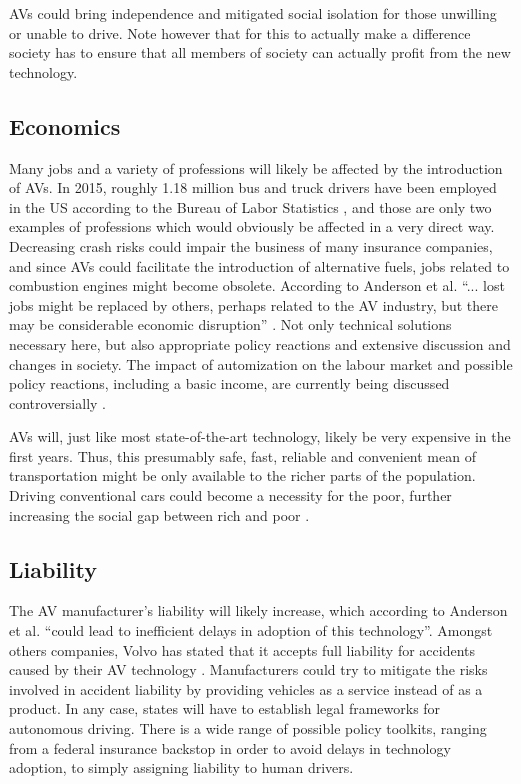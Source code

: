 \documentclass[11pt]{article}
\begin{document}
AVs could bring independence and mitigated social isolation for those unwilling or unable to drive. Note however that for this to actually make a difference society has to ensure that all members of society can actually profit from the new technology.

\subsection{Economics}
Many jobs and a variety of professions will likely be affected by the introduction of AVs. In 2015, roughly 1.18 million bus and truck drivers have been employed in the US according to the Bureau of Labor Statistics \cite{USLabourBureau2016}, and those are only two examples of professions which would obviously be affected in a very direct way. Decreasing crash risks could impair the business of many insurance companies, and since AVs could facilitate the introduction of alternative fuels, jobs related to combustion engines might become obsolete. According to Anderson et al. ``... lost jobs might be replaced by others, perhaps related to the AV industry, but there may be considerable economic disruption'' \cite[p. 40ff]{Anderson2014rand}. Not only technical solutions necessary here, but also appropriate policy reactions and extensive discussion and changes in society. The impact of automization on the labour market and possible policy reactions, including a basic income, are currently being discussed controversially \cite{VanDerVeen2002, Olsen2014}.

AVs will, just like most state-of-the-art technology, likely be very expensive in the first years. Thus, this presumably safe, fast, reliable and convenient mean of transportation might be only available to the richer parts of the population. Driving conventional cars could become a necessity for the poor, further increasing the social gap between rich and poor \cite[p. 39]{Anderson2014rand}.

\subsection{Liability}
The AV manufacturer's liability will likely increase, which according to Anderson et al. ``could lead to inefficient delays in adoption of this technology''. Amongst others companies, Volvo has stated that it accepts full liability for accidents caused by their AV technology \cite{HarrisVolvo2015}. Manufacturers could try to mitigate the risks involved in accident liability by providing vehicles as a service instead of as a product. In any case, states will have to establish legal frameworks for autonomous driving. There is a wide range of possible policy toolkits, ranging from a federal insurance backstop in order to avoid delays in technology adoption, to simply assigning liability to human drivers.
\end{document}
